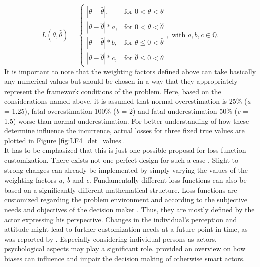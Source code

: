 		\begin{equation}\label{eq:LF_final}
		L(\theta,\hat{\theta}) =
		\begin{cases}
		|\theta - \hat{\theta}|, & \text{for } 0<\hat{\theta}<\theta  \\
		|\theta-\hat{\theta}|*a, & \text{for } 0<\theta<\hat{\theta} \\
		|\theta-\hat{\theta}|*b, & \text{for } \theta\leq0<\hat{\theta} \\
		|\theta-\hat{\theta}|*c, & \text{for } \hat{\theta}\leq0<\theta 
		\end{cases},
		\text{ with } a,b,c \in \mathbb{Q}.
		\end{equation}  
		It is important to note that the weighting factors defined above can take basically any numerical values but should be chosen in a way that they appropriately represent the framework conditions of the problem. Here, based on the considerations named above, it is assumed that normal overestimation is 25\% (\textit{a} = 1.25), fatal overestimation 100\% (\textit{b} = 2) and fatal underestimation 50\% (\textit{c} = 1.5) worse than normal underestimation. For better understanding of how these determine influence the incurrence, actual losses for three fixed true values are plotted in Figure \ref{fig:LF4_det_values}.\\		
		It has to be emphasized that this is just one possible proposal for loss function customization. There exists not one perfect design for such a case \citep{hennig2007}. Slight to strong changes can already be implemented by simply varying the values of the weighting factors \textit{a, b} and \textit{c}. Fundamentally different loss functions can also be based on a significantly different mathematical structure. Loss functions are customized regarding the problem environment and according to the subjective needs and objectives of the decision maker \citep{davidson2015, hennig2007}. Thus, they are mostly defined by the actor expressing his perspective. Changes in the individual's perception and attitude might lead to further customization needs at a future point in time, as was reported by \citet{hennig2007}. Especially considering individual persons as actors, psychological aspects may play a significant role. \citet{bratvold2010making} provided an overview on how biases can influence and impair the decision making of otherwise smart actors.
		
